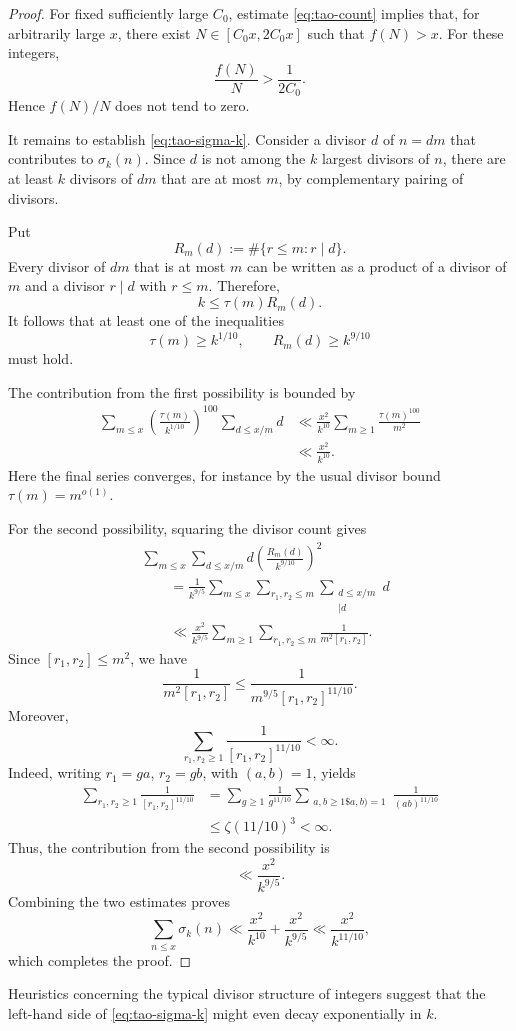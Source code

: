 \begin{proof}
For fixed sufficiently large $C_0$, estimate
\eqref{eq:tao-count} implies that, for arbitrarily large $x$,
there exist $N\in[C_0x,2C_0x]$ such that $f(N)>x$. For these
integers,
\[
    \frac{f(N)}{N}>\frac{1}{2C_0}.
\]
Hence $f(N)/N$ does not tend to zero.

It remains to establish \eqref{eq:tao-sigma-k}. Consider a
divisor $d$ of $n=dm$ that contributes to $\sigma_k(n)$.
Since $d$ is not among the $k$ largest divisors of $n$,
there are at least $k$ divisors of $dm$ that are at most
$m$, by complementary pairing of divisors.

Put
\[
    R_m(d):=\#\{r\leq m:r\mid d\}.
\]
Every divisor of $dm$ that is at most $m$ can be written as
a product of a divisor of $m$ and a divisor $r\mid d$ with
$r\leq m$. Therefore,
\[
    k\leq \tau(m)R_m(d).
\]
It follows that at least one of the inequalities
\[
    \tau(m)\geq k^{1/10},
    \qquad
    R_m(d)\geq k^{9/10}
\]
must hold.

The contribution from the first possibility is bounded by
\[
\begin{aligned}
    \sum_{m\leq x}
    \left(\frac{\tau(m)}{k^{1/10}}\right)^{100}
    \sum_{d\leq x/m}d
    &\ll
    \frac{x^2}{k^{10}}
    \sum_{m\geq1}\frac{\tau(m)^{100}}{m^2}  \\
    &\ll \frac{x^2}{k^{10}}.
\end{aligned}
\]
Here the final series converges, for instance by the usual
divisor bound $\tau(m)=m^{o(1)}$.

For the second possibility, squaring the divisor count gives
\[
\begin{aligned}
&\sum_{m\leq x}\sum_{d\leq x/m}
  d\left(\frac{R_m(d)}{k^{9/10}}\right)^2  \\
&\qquad=
 \frac{1}{k^{9/5}}
 \sum_{m\leq x}
 \sum_{r_1,r_2\leq m}
 \sum_{\substack{d\leq x/m\\ [r_1,r_2]\mid d}}d  \\
&\qquad\ll
 \frac{x^2}{k^{9/5}}
 \sum_{m\geq1}\sum_{r_1,r_2\leq m}
 \frac{1}{m^2[r_1,r_2]}.
\end{aligned}
\]
Since $[r_1,r_2]\leq m^2$, we have
\[
    \frac{1}{m^2[r_1,r_2]}
    \leq
    \frac{1}{m^{9/5}[r_1,r_2]^{11/10}}.
\]
Moreover,
\[
    \sum_{r_1,r_2\geq1}
    \frac{1}{[r_1,r_2]^{11/10}}
    <\infty.
\]
Indeed, writing $r_1=ga$, $r_2=gb$, with $(a,b)=1$, yields
\[
\begin{aligned}
    \sum_{r_1,r_2\geq1}
    \frac{1}{[r_1,r_2]^{11/10}}
    &=
    \sum_{g\geq1}\frac{1}{g^{11/10}}
    \sum_{\substack{a,b\geq1\$a,b)=1}}
    \frac{1}{(ab)^{11/10}}  \\
    &\leq \zeta(11/10)^3<\infty.
\end{aligned}
\]
Thus, the contribution from the second possibility is
\[
    \ll \frac{x^2}{k^{9/5}}.
\]
Combining the two estimates proves
\[
    \sum_{n\leq x}\sigma_k(n)
    \ll
    \frac{x^2}{k^{10}}+\frac{x^2}{k^{9/5}}
    \ll \frac{x^2}{k^{11/10}},
\]
which completes the proof.
\end{proof}

Heuristics concerning the typical divisor structure of
integers suggest that the left-hand side of
\eqref{eq:tao-sigma-k} might even decay exponentially in $k$.
